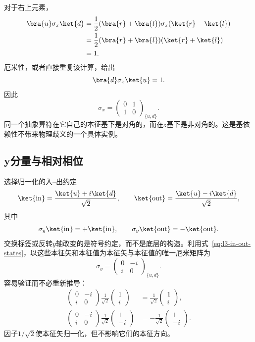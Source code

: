对于右上元素，
\begin{align}
\bra{u}\sigma_x\ket{d}
 &=\frac12(\bra{r}+\bra{l})\sigma_x(\ket{r}-\ket{l})\\
 &=\frac12(\bra{r}+\bra{l})(\ket{r}+\ket{l})\\
 &=1.
\end{align}
厄米性，或者直接重复该计算，给出
\[
\bra{d}\sigma_x\ket{u}=1.
\]
因此
\begin{equation}
\boxed{
\sigma_x=
\begin{pmatrix}
0&1\\
1&0
\end{pmatrix}_{\{u,d\}}.}
\label{eq:sigma-x}
\end{equation}
同一个抽象算符在它自己的本征基下是对角的，而在\(z\)基下是非对角的。这是基依赖性不带来物理歧义的一个具体实例。

\subsection{y分量与相对相位}

选择归一化的入--出约定
\begin{equation}
\ket{\mathrm{in}}=\frac{\ket{u}+i\ket{d}}{\sqrt2},
\qquad
\ket{\mathrm{out}}=\frac{\ket{u}-i\ket{d}}{\sqrt2},
\label{eq:l3-in-out-states}
\end{equation}
其中
\[
\sigma_y\ket{\mathrm{in}}=+\ket{\mathrm{in}},
\qquad
\sigma_y\ket{\mathrm{out}}=-\ket{\mathrm{out}}.
\]
交换标签或反转\(y\)轴改变的是符号约定，而不是底层的构造。利用式~\eqref{eq:l3-in-out-states}，以这些本征矢和本征值为本征矢与本征值的唯一厄米矩阵为
\begin{equation}
\boxed{
\sigma_y=
\begin{pmatrix}
0&-i\\
i&0
\end{pmatrix}_{\{u,d\}}.}
\label{eq:sigma-y}
\end{equation}
容易验证而不必重新推导：
\begin{align}
\begin{pmatrix}0&-i\\i&0\end{pmatrix}
\frac1{\sqrt2}\begin{pmatrix}1\\i\end{pmatrix}
&=\frac1{\sqrt2}\begin{pmatrix}1\\i\end{pmatrix},\\
\begin{pmatrix}0&-i\\i&0\end{pmatrix}
\frac1{\sqrt2}\begin{pmatrix}1\\-i\end{pmatrix}
&=-\frac1{\sqrt2}\begin{pmatrix}1\\-i\end{pmatrix}.
\end{align}
因子\(1/\sqrt2\)使本征矢归一化，但不影响它们的本征方向。

